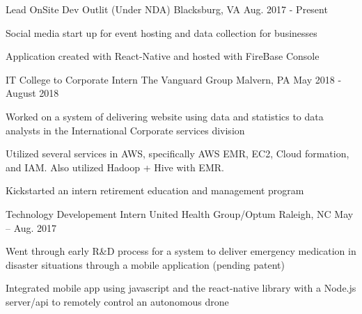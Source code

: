 

\begin{cventries}

  \cventry
    {Lead OnSite Dev} %
	{Outlit (Under NDA)} %
    {Blacksburg, VA} %
    {Aug. 2017 - Present} %
    {
      \begin{cvitems} %
      	\item {Social media start up for event hosting and data collection for businesses} 
	\item {Application created with React-Native and hosted with FireBase Console}
      \end{cvitems}
    }
	
 \cventry
     {IT College to Corporate Intern}
     {The Vanguard Group}
     {Malvern, PA}
     {May 2018 - August 2018}
     {
	\begin{cvitems}
	  \item {Worked on a system of delivering website using data and statistics to data analysts in the International Corporate services division}
	  \item {Utilized several services in AWS, specifically AWS EMR, EC2, Cloud formation, and IAM. Also utilized Hadoop + Hive with EMR.}
	  \item {Kickstarted an intern retirement education and management program}
	\end{cvitems}
     }

  \cventry
    {Technology Developement Intern} %
    {United Health Group/Optum} %
    {Raleigh, NC} %
    {May – Aug. 2017} %
    {
      \begin{cvitems} %
        \item {Went through early R\&D process for a system to deliver emergency medication in disaster situations through a mobile application (pending patent)}
        \item {Integrated mobile app using javascript and the react-native library with a Node.js server/api to remotely control an autonomous drone}
      \end{cvitems}
    }



\end{cventries}
